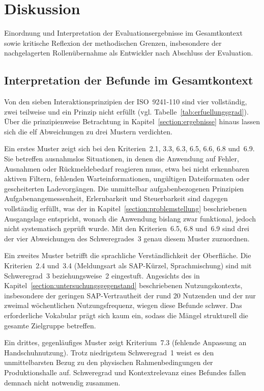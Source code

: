 \chapter{Diskussion}
\label{chapter:kapitel5}
Einordnung und Interpretation der Evaluationsergebnisse im Gesamtkontext sowie kritische Reflexion der methodischen Grenzen, 
insbesondere der nachgelagerten Rollenübernahme als Entwickler nach Abschluss der Evaluation.

\section{Interpretation der Befunde im Gesamtkontext}
\label{gesamtkontext}

Von den sieben Interaktionsprinzipien der ISO~9241-110 sind vier vollständig, zwei
teilweise und ein Prinzip nicht erfüllt (vgl. Tabelle~\ref{tab:erfuellungsgrad}).
Über die prinzipienweise Betrachtung in Kapitel~\ref{section:ergebnisse} hinaus
lassen sich die elf Abweichungen zu drei Mustern verdichten.

Ein erstes Muster zeigt sich bei den Kriterien~2.1, 3.3, 6.3, 6.5, 6.6, 6.8 und~6.9.
Sie betreffen ausnahmslos Situationen, in denen die Anwendung auf Fehler, Ausnahmen
oder Rückmeldebedarf reagieren muss, etwa bei nicht erkennbaren aktiven Filtern,
fehlenden Warteinformationen, ungültigen Dateiformaten oder gescheiterten
Ladevorgängen. Die unmittelbar aufgabenbezogenen Prinzipien Aufgabenangemessenheit,
Erlernbarkeit und Steuerbarkeit sind dagegen vollständig erfüllt, was der in
Kapitel~\ref{section:problemstellung} beschriebenen Ausgangslage entspricht, wonach
die Anwendung bislang zwar funktional, jedoch nicht systematisch geprüft wurde.
Mit den Kriterien~6.5, 6.8 und~6.9 sind drei der vier Abweichungen
des Schweregrades~3 genau diesem Muster zuzuordnen.

Ein zweites Muster betrifft die sprachliche Verständlichkeit der Oberfläche. Die
Kriterien~2.4 und~3.4 (Meldungsart als SAP-Kürzel, Sprachmischung) sind mit
Schweregrad~3 beziehungsweise~2 eingestuft. Angesichts des in
Kapitel~\ref{section:untersuchungsgegenstand} beschriebenen Nutzungskontexts,
insbesondere der geringen SAP-Vertrautheit der rund 20 Nutzenden und der nur
zweimal wöchentlichen Nutzungsfrequenz, wiegen diese Befunde schwer. Das
erforderliche Vokabular prägt sich kaum ein, sodass die Mängel strukturell die
gesamte Zielgruppe betreffen.

Ein drittes, gegenläufiges Muster zeigt Kriterium~7.3 (fehlende Anpassung an
Handschuhnutzung). Trotz niedrigstem Schweregrad~1 weist es den unmittelbarsten
Bezug zu den physischen Rahmenbedingungen der Produktionshalle auf. Schweregrad
und Kontextrelevanz eines Befundes fallen demnach nicht notwendig zusammen.

